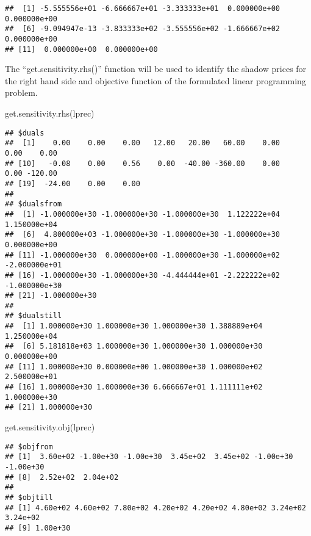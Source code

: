 \documentclass[
]{article}
\newenvironment{Shaded}{\begin{snugshade}}{\end{snugshade}}
\newcommand{\FunctionTok}[1]{\textcolor[rgb]{0.00,0.00,0.00}{#1}}
\newcommand{\NormalTok}[1]{#1}
\begin{document}
\begin{verbatim}
##  [1] -5.555556e+01 -6.666667e+01 -3.333333e+01  0.000000e+00  0.000000e+00
##  [6] -9.094947e-13 -3.833333e+02 -3.555556e+02 -1.666667e+02  0.000000e+00
## [11]  0.000000e+00  0.000000e+00
\end{verbatim}

The ``get.sensitivity.rhs()'' function will be used to identify the
shadow prices for the right hand side and objective function of the
formulated linear programming problem.

\begin{Shaded}
\begin{Highlighting}[]
\FunctionTok{get.sensitivity.rhs}\NormalTok{(lprec)}
\end{Highlighting}
\end{Shaded}

\begin{verbatim}
## $duals
##  [1]    0.00    0.00    0.00   12.00   20.00   60.00    0.00    0.00    0.00
## [10]   -0.08    0.00    0.56    0.00  -40.00 -360.00    0.00    0.00 -120.00
## [19]  -24.00    0.00    0.00
## 
## $dualsfrom
##  [1] -1.000000e+30 -1.000000e+30 -1.000000e+30  1.122222e+04  1.150000e+04
##  [6]  4.800000e+03 -1.000000e+30 -1.000000e+30 -1.000000e+30  0.000000e+00
## [11] -1.000000e+30  0.000000e+00 -1.000000e+30 -1.000000e+02 -2.000000e+01
## [16] -1.000000e+30 -1.000000e+30 -4.444444e+01 -2.222222e+02 -1.000000e+30
## [21] -1.000000e+30
## 
## $dualstill
##  [1] 1.000000e+30 1.000000e+30 1.000000e+30 1.388889e+04 1.250000e+04
##  [6] 5.181818e+03 1.000000e+30 1.000000e+30 1.000000e+30 0.000000e+00
## [11] 1.000000e+30 0.000000e+00 1.000000e+30 1.000000e+02 2.500000e+01
## [16] 1.000000e+30 1.000000e+30 6.666667e+01 1.111111e+02 1.000000e+30
## [21] 1.000000e+30
\end{verbatim}

\begin{Shaded}
\begin{Highlighting}[]
\FunctionTok{get.sensitivity.obj}\NormalTok{(lprec) }
\end{Highlighting}
\end{Shaded}

\begin{verbatim}
## $objfrom
## [1]  3.60e+02 -1.00e+30 -1.00e+30  3.45e+02  3.45e+02 -1.00e+30 -1.00e+30
## [8]  2.52e+02  2.04e+02
## 
## $objtill
## [1] 4.60e+02 4.60e+02 7.80e+02 4.20e+02 4.20e+02 4.80e+02 3.24e+02 3.24e+02
## [9] 1.00e+30
\end{verbatim}
\end{document}

